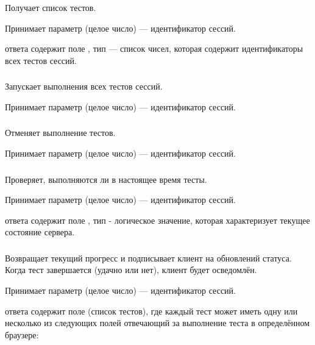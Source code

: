 Получает список тестов.

Принимает параметр  (целое число) — идентификатор сессий.

 ответа содержит поле , тип — список чисел, которая содержит идентификаторы всех тестов сессий.

\subsubsection{}

Запускает выполнения всех тестов сессий.

Принимает параметр  (целое число) — идентификатор сессий.

\subsubsection{}

Отменяет выполнение тестов.

Принимает параметр  (целое число) — идентификатор сессий.

\subsubsection{}

Проверяет, выполняются ли в настоящее время тесты.

Принимает параметр  (целое число) — идентификатор сессий.

 ответа содержит поле , тип - логическое значение, которая характеризует текущее состояние сервера.

\subsubsection{}

Возвращает текущий прогресс и подписывает клиент на обновлений статуса. Когда тест завершается (удачно или нет), клиент будет осведомлён.

Принимает параметр  (целое число) — идентификатор сессий.

 ответа содержит поле  (список тестов), где каждый тест может иметь одну или несколько из следующих полей отвечающий за выполнение теста в определённом браузере:

